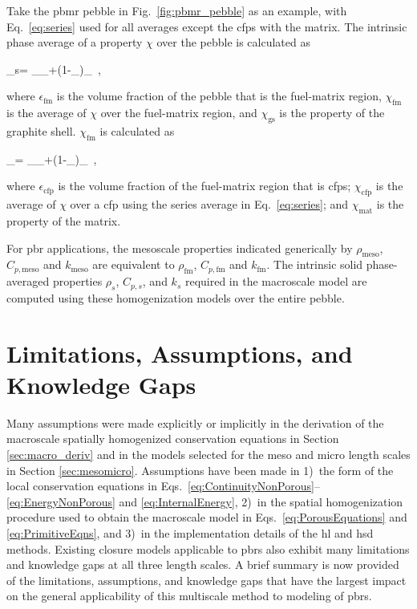 Take the \gls{pbmr} pebble in Fig.\ \ref{fig:pbmr_pebble} as an example, with Eq.\ \eqref{eq:series} used for all averages except the \glspl{cfp} with the matrix. The intrinsic phase average of a property \(\chi\) over the pebble is calculated as

\beq
\label{eq:NonTransport2}
\chi_s= \epsilon_\chi_+(1-\epsilon_)\chi_\ ,
\eeq

\noindent where \(\epsilon_\text{fm}\) is the volume fraction of the pebble that is the fuel-matrix region, \(\chi_\text{fm}\) is the average of \(\chi\) over the fuel-matrix region, and \(\chi_\text{gs}\) is the property of the graphite shell. \(\chi_\text{fm}\) is calculated as

\beq
\label{eq:NonTransport}
\chi_= \epsilon_\chi_+(1-\epsilon_)\chi_\ ,
\eeq

\noindent where \(\epsilon_\text{cfp}\) is the volume fraction of the fuel-matrix region that is \glspl{cfp}; \(\chi_\text{cfp}\) is the average of \(\chi\) over a \gls{cfp} using the series average in Eq.\ \eqref{eq:series}; and \(\chi_\text{mat}\) is the property of the matrix. 

For \gls{pbr} applications, the mesoscale properties indicated generically by \(\rho_\text{meso}\), \(C_{p,\text{meso}}\) and \(k_\text{meso}\) are equivalent to \(\rho_\text{fm}\), \(C_{p,\text{fm}}\) and \(k_\text{fm}\). The intrinsic solid phase-averaged properties \(\rho_s\), \(C_{p,s}\), and \(k_s\) required in the macroscale model are computed using these homogenization models over the entire pebble.

\section{Limitations, Assumptions, and Knowledge Gaps}
\label{sec:MacroAssumptions}

Many assumptions were made explicitly or implicitly in the derivation of the macroscale spatially homogenized conservation equations in Section \ref{sec:macro_deriv} and in the models selected for the meso and micro length scales in Section \ref{sec:mesomicro}. Assumptions have been made in 1)~the form of the local conservation equations in Eqs.\ \eqref{eq:ContinuityNonPorous}--\eqref{eq:EnergyNonPorous} and \eqref{eq:InternalEnergy}, 2)~in the spatial homogenization procedure used to obtain the macroscale model in Eqs.\ \eqref{eq:PorousEquations} and \eqref{eq:PrimitiveEqns}, and 3)~in the implementation details of the \gls{hl} and \gls{hsd} methods. Existing closure models applicable to \glspl{pbr} also exhibit many limitations and knowledge gaps at all three length scales. A brief summary is now provided of the limitations, assumptions, and knowledge gaps that have the largest impact on the general applicability of this multiscale method to modeling of \glspl{pbr}.

